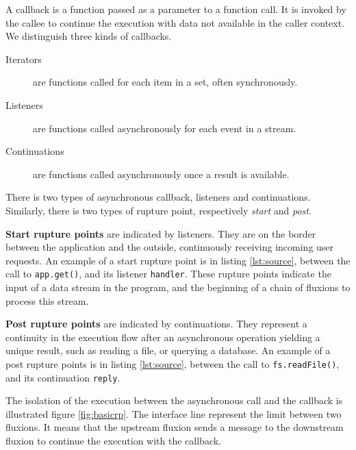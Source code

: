 A callback is a function passed as a parameter to a function call.
It is invoked by the callee to continue the execution with data not available in the caller context.
We distinguish three kinds of callbacks.

\begin{description}
  \item[Iterators] are functions called for each item in a set, often synchronously.
  \item[Listeners] are functions called asynchronously for each event in a stream.
  \item[Continuations] are functions called asynchronously once a result is available.
\end{description}

There is two types of asynchronous callback, listeners and continuations.
Similarly, there is two types of rupture point, respectively \textit{start} and \textit{post}.

\textbf{Start rupture points} are indicated by listeners. They are on the border between the application and the outside, continuously receiving incoming user requests.
An example of a start rupture point is in listing \ref{lst:source}, between the call to \texttt{app.get()}, and its listener \texttt{handler}.
These rupture points indicate the input of a data stream in the program, and the beginning of a chain of fluxions to process this stream.

\textbf{Post rupture points} are indicated by continuations.
They represent a continuity in the execution flow after an asynchronous operation yielding a unique result, such as reading a file, or querying a database.
An example of a post rupture points is in listing \ref{lst:source}, between the call to \texttt{fs.readFile()}, and its continuation \texttt{reply}.


The isolation of the execution between the asynchronous call and the callback is illustrated figure \ref{fig:basicrp}. The interface line represent the limit between two fluxions. It means that the upstream fluxion sends a message to the downstream fluxion to continue the execution with the callback.

